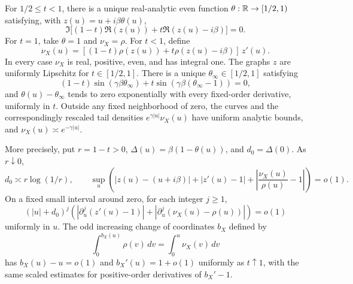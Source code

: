 \begin{lemma}
\label{lem:06-magnetic-curve}
For \(1/2\le t<1\), there is a unique real-analytic even function
\(\theta:\mathbb R\to[1/2,1)\) satisfying, with
\(z(u)=u+i\beta\theta(u)\),
\begin{equation}
 \Im\bigl[(1-t)\mathfrak R(z(u))
             +t\mathfrak R(z(u)-i\beta)\bigr]=0.
 \label{eq:06-curve}
\end{equation}
For \(t=1\), take \(\theta=1\) and \(\nu_X=\rho\).  For \(t<1\), define
\begin{equation}
 \nu_X(u)=
 [(1-t)\rho(z(u))+t\rho(z(u)-i\beta)]\,z'(u).
 \label{eq:06-density}
\end{equation}
In every case \(\nu_X\) is real, positive, even, and has integral one.
The graphs \(z\) are uniformly Lipschitz for \(t\in[1/2,1]\).
There is a unique \(\theta_\infty\in[1/2,1]\) satisfying
\begin{equation}
 (1-t)\sin(\gamma\beta\theta_\infty)
 +t\sin(\gamma\beta(\theta_\infty-1))=0,
 \label{eq:06-limit-height}
\end{equation}
and \(\theta(u)-\theta_\infty\) tends to zero exponentially with every
fixed-order derivative, uniformly in \(t\).
Outside any fixed neighborhood of zero, the curves and the
correspondingly rescaled tail densities
\(e^{\gamma|u|}\nu_X(u)\) have uniform analytic bounds, and
\(\nu_X(u)\asymp e^{-\gamma|u|}\).

More precisely, put \(r=1-t>0\),
\(\Delta(u)=\beta(1-\theta(u))\), and \(d_0=\Delta(0)\).
As \(r\downarrow0\),
\begin{equation}
 d_0\asymp r\log(1/r),\qquad
 \sup_u\left(
 |z(u)-(u+i\beta)|+|z'(u)-1|
 +\left|\frac{\nu_X(u)}{\rho(u)}-1\right|\right)=o(1).
 \label{eq:06-center-regularity}
\end{equation}
On a fixed small interval around zero, for each integer \(j\ge1\),
\[
 (|u|+d_0)^j
 \left(
 |\partial_u^j(z'(u)-1)|
 +|\partial_u^j(\nu_X(u)-\rho(u))|
 \right)=o(1)
\]
uniformly in \(u\).
The odd increasing change of coordinates \(b_X\) defined by
\[
 \int_0^{b_X(u)}\rho(v)\,dv=\int_0^u\nu_X(v)\,dv
\]
has \(b_X(u)-u=o(1)\) and \(b_X'(u)=1+o(1)\) uniformly as
\(t\uparrow1\), with the same scaled estimates for positive-order
derivatives of \(b_X'-1\).
\end{lemma}

